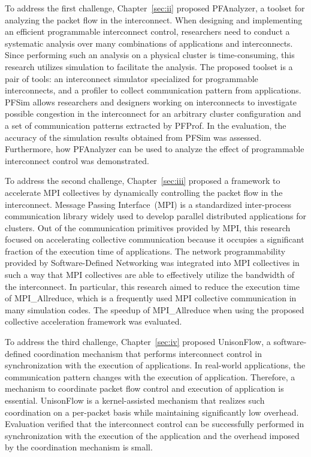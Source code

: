 To address the first challenge, Chapter~\ref{sec:ii} proposed PFAnalyzer, a
toolset for analyzing the packet flow in the interconnect. When designing and
implementing an efficient programmable interconnect control, researchers need
to conduct a systematic analysis over many combinations of applications and
interconnects. Since performing such an analysis on a physical cluster is
time-consuming, this research utilizes simulation to facilitate the analysis.
The proposed toolset is a pair of tools: an interconnect simulator
specialized for programmable interconnects, and a profiler to collect
communication pattern from applications. PFSim allows researchers and
designers working on interconnects to investigate possible congestion in the
interconnect for an arbitrary cluster configuration and a set of communication
patterns extracted by PFProf. In the evaluation, the accuracy of the
simulation results obtained from PFSim was assessed. Furthermore, how
PFAnalyzer can be used to analyze the effect of programmable interconnect
control was demonstrated.

To address the second challenge, Chapter~\ref{sec:iii} proposed a framework to
accelerate MPI collectives by dynamically controlling the packet flow in the
interconnect. Message Passing Interface~(MPI) is a standardized inter-process
communication library widely used to develop parallel distributed
applications for clusters. Out of the communication primitives provided by
MPI, this research focused on accelerating collective communication because it
occupies a significant fraction of the execution time of applications. The
network programmability provided by Software-Defined Networking was integrated
into MPI collectives in such a way that MPI collectives are able to
effectively utilize the bandwidth of the interconnect. In particular, this
research aimed to reduce the execution time of MPI\_Allreduce, which is a
frequently used MPI collective communication in many simulation codes. The
speedup of MPI\_Allreduce when using the proposed collective acceleration
framework was evaluated.

To address the third challenge, Chapter~\ref{sec:iv} proposed UnisonFlow, a
software-defined coordination mechanism that performs interconnect control in
synchronization with the execution of applications. In real-world
applications, the communication pattern changes with the execution of
application. Therefore, a mechanism to coordinate packet flow control and
execution of application is essential. UnisonFlow is a kernel-assisted
mechanism that realizes such coordination on a per-packet basis while
maintaining significantly low overhead. Evaluation verified that the
interconnect control can be successfully performed in synchronization with the
execution of the application and the overhead imposed by the coordination
mechanism is small.

